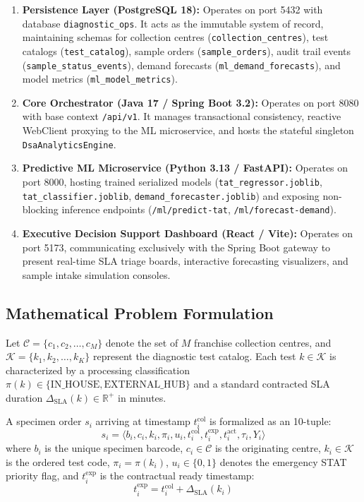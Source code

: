 \documentclass[conference]{IEEEtran}
\begin{document}
\begin{enumerate}
    \item \textbf{Persistence Layer (PostgreSQL 18):} Operates on port 5432 with database \texttt{diagnostic\_ops}. It acts as the immutable system of record, maintaining schemas for collection centres (\texttt{collection\_centres}), test catalogs (\texttt{test\_catalog}), sample orders (\texttt{sample\_orders}), audit trail events (\texttt{sample\_status\_events}), demand forecasts (\texttt{ml\_demand\_forecasts}), and model metrics (\texttt{ml\_model\_metrics}).
    \item \textbf{Core Orchestrator (Java 17 / Spring Boot 3.2):} Operates on port 8080 with base context \texttt{/api/v1}. It manages transactional consistency, reactive WebClient proxying to the ML microservice, and hosts the stateful singleton \texttt{DsaAnalyticsEngine}.
    \item \textbf{Predictive ML Microservice (Python 3.13 / FastAPI):} Operates on port 8000, hosting trained serialized models (\texttt{tat\_regressor.joblib}, \texttt{tat\_classifier.joblib}, \texttt{demand\_forecaster.joblib}) and exposing non-blocking inference endpoints (\texttt{/ml/predict-tat}, \texttt{/ml/forecast-demand}).
    \item \textbf{Executive Decision Support Dashboard (React / Vite):} Operates on port 5173, communicating exclusively with the Spring Boot gateway to present real-time SLA triage boards, interactive forecasting visualizers, and sample intake simulation consoles.
\end{enumerate}

\subsection{Mathematical Problem Formulation}
Let $\mathcal{C} = \{c_1, c_2, \dots, c_M\}$ denote the set of $M$ franchise collection centres, and $\mathcal{K} = \{k_1, k_2, \dots, k_K\}$ represent the diagnostic test catalog. Each test $k \in \mathcal{K}$ is characterized by a processing classification $\pi(k) \in \{\text{IN\_HOUSE}, \text{EXTERNAL\_HUB}\}$ and a standard contracted SLA duration $\Delta_{\text{SLA}}(k) \in \mathbb{R}^+$ in minutes.

A specimen order $s_i$ arriving at timestamp $t_i^{\text{col}}$ is formalized as an 10-tuple:
\begin{equation}
s_i = \langle b_i, c_i, k_i, \pi_i, u_i, t_i^{\text{col}}, t_i^{\text{exp}}, t_i^{\text{act}}, \tau_i, Y_i \rangle
\end{equation}
where $b_i$ is the unique specimen barcode, $c_i \in \mathcal{C}$ is the originating centre, $k_i \in \mathcal{K}$ is the ordered test code, $\pi_i = \pi(k_i)$, $u_i \in \{0, 1\}$ denotes the emergency STAT priority flag, and $t_i^{\text{exp}}$ is the contractual ready timestamp:
\begin{equation}
t_i^{\text{exp}} = t_i^{\text{col}} + \Delta_{\text{SLA}}(k_i)
\end{equation}
\end{document}
